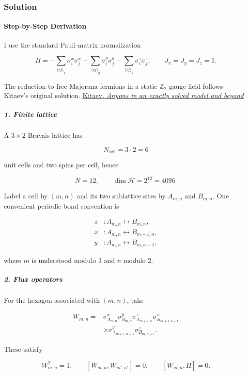 \subsubsection*{Solution}
\paragraph*{Step-by-Step Derivation}

I use the standard Pauli-matrix normalization

\[
H=-\sum_{\langle ij\rangle_x}\sigma_i^x\sigma_j^x -\sum_{\langle ij\rangle_y}\sigma_i^y\sigma_j^y -\sum_{\langle ij\rangle_z}\sigma_i^z\sigma_j^z, \qquad J_x=J_y=J_z=1.
\]

The reduction to free Majorana fermions in a static $\mathbb Z_2$ gauge field follows Kitaev's original solution. \href{\detokenize{https://arxiv.org/abs/cond-mat/0506438}}{Kitaev, \emph{Anyons in an exactly solved model and beyond}}

\subparagraph*{1. Finite lattice}

A $3\times2$ Bravais lattice has

\[
N_{\mathrm{cell}}=3\cdot2=6
\]

unit cells and two spins per cell, hence

\[
N=12,\qquad \dim\mathcal H=2^{12}=4096.
\]

Label a cell by $(m,n)$ and its two sublattice sites by $A_{m,n}$ and $B_{m,n}$. One convenient periodic bond convention is

\[
\begin{aligned}
z &: A_{m,n}\longleftrightarrow B_{m,n},\\
x &: A_{m,n}\longleftrightarrow B_{m-1,n},\\
y &: A_{m,n}\longleftrightarrow B_{m,n-1},
\end{aligned}
\]

where $m$ is understood modulo $3$ and $n$ modulo $2$.

\subparagraph*{2. Flux operators}

For the hexagon associated with $(m,n)$, take

\[
\begin{aligned}
W_{m,n}={}&
\sigma^x_{A_{m,n}}
\sigma^y_{B_{m,n}}
\sigma^z_{A_{m+1,n}}
\sigma^x_{B_{m+1,n-1}}\\
&\times
\sigma^y_{A_{m+1,n-1}}
\sigma^z_{B_{m,n-1}} .
\end{aligned}
\]

These satisfy

\[
W_{m,n}^2=1,\qquad [W_{m,n},W_{m',n'}]=0,\qquad [W_{m,n},H]=0.
\]

